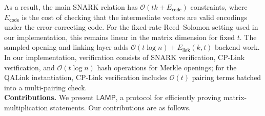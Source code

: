 \documentclass[conference,compsoc]{IEEEtran}
\newcommand{\protocol}{\textsf{LAMP}}   %
\theoremstyle{plain}
\theoremstyle{definition}
\theoremstyle{remark}
\begin{document}
As a result, the main SNARK relation has
\(\mathcal{O}(tk+E_{\mathsf{code}})\) constraints, where
\(E_{\mathsf{code}}\) is the cost of checking that the
intermediate vectors are valid encodings under the error-correcting code. For the fixed-rate Reed--Solomon setting used in our implementation,
this remains linear in the matrix dimension for fixed \(t\).  The sampled
opening and linking layer adds
\(\mathcal{O}(t\log n)+E_{\mathsf{link}}(k,t)\) backend work.  In our
implementation, verification consists of SNARK verification, CP-Link
verification, and \(\mathcal{O}(t\log n)\) hash operations for Merkle openings;
for the QALink instantiation, CP-Link verification includes
\(\mathcal{O}(t)\) pairing terms batched into a multi-pairing check.\\


\noindent\textbf{Contributions.}
We present \(\protocol\), a protocol for efficiently proving
matrix-multiplication statements.  Our contributions are as follows.
\end{document}
